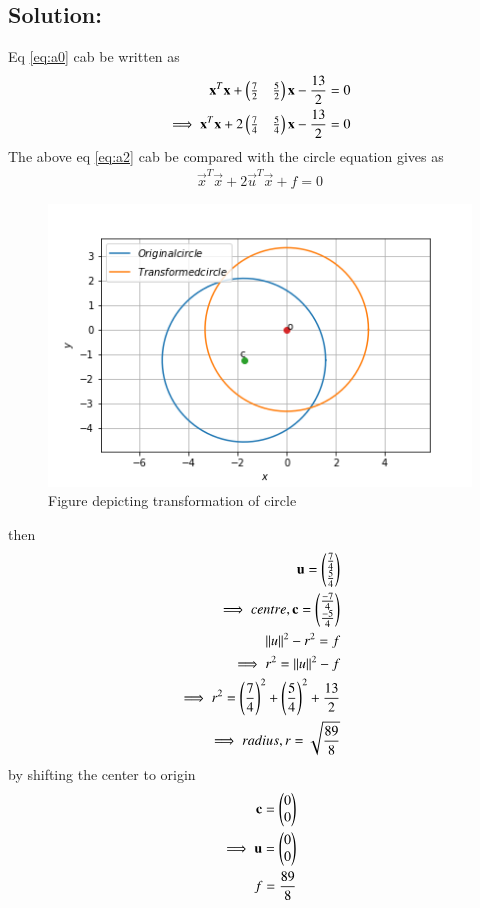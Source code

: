 \documentclass[journal,12pt,twocolumn]{IEEEtran}
\begin{document}
\subsection*{Solution:}
Eq \eqref{eq:a0} cab be written as
\begin{align}
\mathbf{x}^T\mathbf{x}+\begin{pmatrix}\frac{7}{2}&\frac{5}{2}\end{pmatrix}\mathbf{x}-\frac{13}{2}=0\\
\implies \mathbf{x}^T\mathbf{x}+2\begin{pmatrix}\frac{7}{4}&\frac{5}{4}\end{pmatrix}\mathbf{x}-\frac{13}{2}=0
\label{eq:a2}
\end{align}
The above eq \eqref{eq:a2} cab be compared with the circle equation gives as
\begin{align}
\vec{x}^T\vec{x}+2\vec{u}^T\vec{x}+f=0
\label{eq:a3}
\end{align}
\begin{figure}[!ht]
	\centering
	\includegraphics[width=\columnwidth]{circle.png}
	\caption{Figure depicting transformation of circle}
	\label{myfig}
\end{figure}
then
\begin{align}
\mathbf{u} = \begin{pmatrix}\frac{7}{4}\\\frac{5}{4}\end{pmatrix}\\
\implies centre, \mathbf{c} = \begin{pmatrix}\frac{-7}{4}\\\frac{-5}{4}\end{pmatrix}\\
\left\lVert u\right\rVert^2 - r^2 = f\\
\implies r^2 = \left\lVert u\right\rVert^2 - f\\
\implies r^2 = \left(\frac{7}{4}\right)^2+\left(\frac{5}{4}\right)^2+\frac{13}{2}\\
\implies radius, r = \sqrt{\frac{89}{8}}
\end{align}
by shifting the center to origin
\begin{align}
\mathbf{c} = \begin{pmatrix}0\\0\end{pmatrix}\\
\implies \mathbf{u} = \begin{pmatrix}0\\0\end{pmatrix}\\
f = \frac{89}{8}
\end{align}
\end{document}
